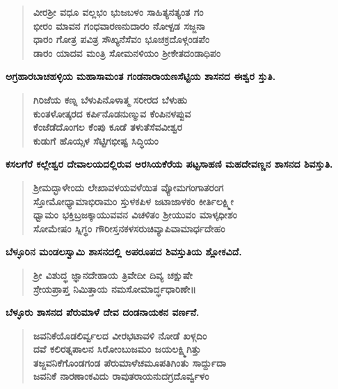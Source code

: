 \begin{verse}
\textbf{ವೀರಶ‍್ರೀ ವಧೂ ವಲ್ಲಭಂ ಭುಜಬಳಂ ಸಾಹಿತ್ಯನತ್ಯಂತ ಗಂ \\ ಭೀರಂ ಮಾವನ ಗಂಧವಾರಣನುದಾರಂ ನೋಳ್ಪಡ ಸಜ್ಜನಾ \\ ಧಾರಂ ಗೋತ್ರ ಪವಿತ್ರ ಸೌಖ್ಯನೆಸೆವಂ ಭೂಚಕ್ರದೊಳ್ಗಂಡಪೆಂ \\ ಡಾರಂ ಯಾದವ ಮಂತ್ರಿ ಸೋಮನಳಿಯಂ ಶ‍್ರೀಕೇತದಂಡಾಧಿಪಂ}
\end{verse}

\noindent
\textbf{ಅಗ್ರಹಾರಬಾಚಹಳ್ಳಿಯ ಮಹಾಸಾಮಂತ ಗಂಡನಾರಾಯಣಸೆಟ್ಟಿಯ ಶಾಸನದ ಈಶ್ವರ ಸ್ತುತಿ.}

\begin{verse}
\textbf{ಗಿರಿಜೆಯ ಕಣ್ನ ಬೆಳುಪಿನೊಳಾತ್ಮ ಸರೀರದ ಬೆಳುಹು \\ ಕುಂತಳೋತ್ಕರದ ಕರ್ಪಿನೊಡನುಣ್ಮುವ ಕೆಂಪಿನಳಪ್ಪುವ \\ ಕೆಂಜೆಡೆದೊಂಗಲ ಕೆಂಪು ಕೂಡೆ ತಳುತೆಸೆವವೀಶ್ವರ \\ ಕುಡುಗೆ ಹೊಯ್ಸಳ ಸೆಟ್ಟಿಗಭೀಷ್ಟ ಸಿದ್ಧಿಯಂ}
\end{verse}

\noindent
\textbf{ಕಸಲಗೆರೆ ಕಲ್ಲೇಶ್ವರ ದೇವಾಲಯದಲ್ಲಿರುವ ಅರಸಿಯಕೆರೆಯ ಪಟ್ಟಸಾಹಣಿ ಮಹದೇವಣ್ಣನ ಶಾಸನದ ಶಿವಸ್ತುತಿ.}

\begin{verse}
\textbf{ಶ‍್ರೀಮದ್ಭಾಳೇಂದು ಲೇಖಾವಳಯವಳೆಯಿತ ವ್ಯೋಮಗಂಗಾತರಂಗ \\ ಸ್ತೋಮೋಧ್ಯಾಮಾಭಿರಾಮಂ ಸ್ತುಳಕಪಿಳ ಜಟಾಜಾಳಕಂ ಕೀರ್ತಿಲಕ್ಷ್ಮೀ \\ ಧ್ವಾಮಂ ಭಕ್ತಿಬ್ರಜಕ್ಕಾಯುವವನ ವಿಚಳಿತಂ ಶ‍್ರೀಯುವಂ ಮಾಳ್ಕಧೀಶಂ\\ ಸೋಮೇಷಂ ಸ್ನಿಗ್ಧಂ ಗೌರೀಸ್ತನಕಳಸರುಚಿವ್ಯಾಪಿವಾಮಾರ್ಧದೇಹಂ}
\end{verse}

\noindent
\textbf{ಬೆಳ್ಳೂರಿನ ಮಂಡಲಸ್ವಾಮಿ ಶಾಸನದಲ್ಲಿ ಅಪರೂಪದ ಶಿವಸ್ತುತಿಯ ಶ್ಲೋಕವಿದೆ.}

\begin{verse}
\textbf{ಶ‍್ರೀ ವಿಶುದ್ಧ ಜ್ಞಾನದೇಹಾಯ ತ್ರಿವೇದೀ ದಿವ್ಯ ಚಕ್ಷುಷೇ\\ ಸ್ರೇಯಪ್ರಾಪ್ತ ನಿಮಿತ್ತಾಯ ನಮಸೋಮಾರ್ದ್ಧಧಾರಿಣೇ॥}
\end{verse}

\newpage

\noindent
\textbf{ಬೆಳ್ಳೂರು ಶಾಸನದ ಪೆರುಮಾಳೆ ದೇವ ದಂಡನಾಯಕನ ವರ್ಣನೆ.}

\begin{verse}
\textbf{ಜವನಿಕೆಯೊಡಲಿರ್ವ್ವಲದ ವೀರಭಟಾವಳಿ ನೋಡೆ ಖಳ್ಗದಿಂ\\ ದವೆ ಕಲಿರತ್ನಪಾಲನ ಸಿರೋಂಬುಜಮಂ ಜಯಲಕ್ಷ್ಮಿಗಿತ್ತು \\ ತಜ್ಜವನಿಕೆಗೊಂಡಗಂಡ ಪೆರುಮಾಳೆಚಮೂಪತಿಗಿಂತು ಸಾರ್ದ್ದುದಾ \\ ಜವನಿಕೆ ನಾರಣಾಂಕವಿದು ರಾವುತರಾಯನುದಗ್ರದೊರ್ವ್ವಳಂ}
\end{verse}

